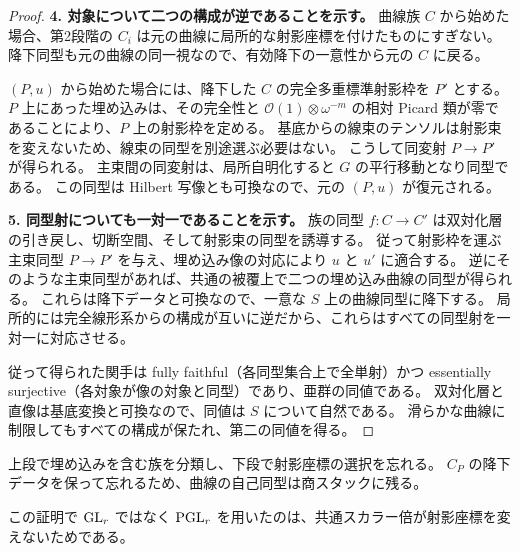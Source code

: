 \documentclass[dvipdfmx,a4paper,11pt]{article}
\theoremstyle{definition}
\newcommand{\OO}{\mathcal O}\newcommand{\MM}{\mathcal M}\newcommand{\TT}{\mathcal T}
\begin{document}
\begin{proof}
\textbf{4. 対象について二つの構成が逆であることを示す。}
曲線族 $C$ から始めた場合、第2段階の $C_i$ は元の曲線に局所的な射影座標を付けたものにすぎない。
降下同型も元の曲線の同一視なので、有効降下の一意性から元の $C$ に戻る。

$(P,u)$ から始めた場合には、降下した $C$ の完全多重標準射影枠を $P'$ とする。
$P$ 上にあった埋め込みは、その完全性と $\OO(1)\otimes\omega^{-m}$ の相対 Picard 類が零であることにより、$P$ 上の射影枠を定める。
基底からの線束のテンソルは射影束を変えないため、線束の同型を別途選ぶ必要はない。
こうして同変射 $P\to P'$ が得られる。
主束間の同変射は、局所自明化すると $G$ の平行移動となり同型である。
この同型は Hilbert 写像とも可換なので、元の $(P,u)$ が復元される。

\textbf{5. 同型射についても一対一であることを示す。}
族の同型 $f:C\to C'$ は双対化層の引き戻し、切断空間、そして射影束の同型を誘導する。
従って射影枠を運ぶ主束同型 $P\to P'$ を与え、埋め込み像の対応により $u$ と $u'$ に適合する。
逆にそのような主束同型があれば、共通の被覆上で二つの埋め込み曲線の同型が得られる。
これらは降下データと可換なので、一意な $S$ 上の曲線同型に降下する。
局所的には完全線形系からの構成が互いに逆だから、これらはすべての同型射を一対一に対応させる。

従って得られた関手は fully faithful（各同型集合上で全単射）かつ essentially surjective（各対象が像の対象と同型）であり、亜群の同値である。
双対化層と直像は基底変換と可換なので、同値は $S$ について自然である。
滑らかな曲線に制限してもすべての構成が保たれ、第二の同値を得る。
\end{proof}
\par\medskip
\noindent\begin{minipage}{\linewidth}
\begin{center}
\end{center}
上段で埋め込みを含む族を分類し、下段で射影座標の選択を忘れる。
$C_P$ の降下データを保って忘れるため、曲線の自己同型は商スタックに残る。
\end{minipage}\par\medskip

この証明で $\operatorname{GL}_r$ ではなく $\operatorname{PGL}_r$ を用いたのは、共通スカラー倍が射影座標を変えないためである。
\end{document}
